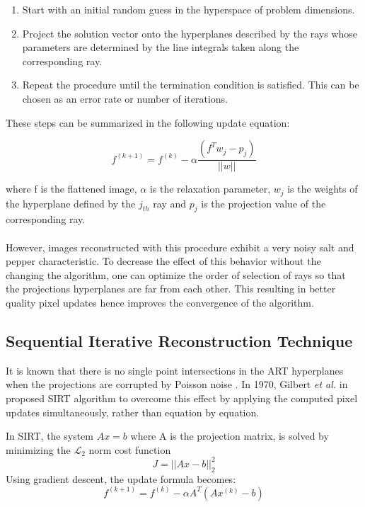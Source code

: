 \documentclass[journal]{IEEEtran}
\begin{document}
\begin{enumerate}
	\item Start with an initial random guess in the hyperspace of problem dimensions. 
	\item Project the solution vector onto the hyperplanes described by the rays whose parameters are determined by the line integrals taken along the corresponding ray. 
	\item Repeat the procedure until the termination condition is satisfied. This can be chosen as an error rate or number of iterations.  
\end{enumerate}

These steps can be summarized in the following update equation: 

\begin{equation}
	f^{(k+1)} = f^{(k)} - \alpha\frac{(f^Tw_j - p_j)}{||w||} 
\end{equation}

where f is the flattened image, $\alpha$ is the relaxation parameter, $w_j$ is the weights of the hyperplane defined by the $j_{th}$ ray and $p_j$ is the projection value of the corresponding ray. 
\\
\\
However, images reconstructed with this procedure exhibit a very noisy salt and pepper characteristic. To decrease the effect of this behavior without the changing the algorithm, one can optimize the order of selection of rays so that the projections hyperplanes are far from each other. This resulting in better quality pixel updates hence improves the convergence of the algorithm.

\subsection{Sequential Iterative Reconstruction Technique}

It is known that there is no single point intersections in the ART hyperplanes when the projections are corrupted by Poisson noise \cite*{dong2020accelerated}.  
In 1970, Gilbert \textit{et al.} in \cite*{gilbert1972iterative} proposed SIRT algorithm to overcome this effect by applying the computed pixel updates simultaneously, rather than equation by equation. 

In SIRT, the system $Ax=b$ where A is the projection matrix, is solved by minimizing the $\mathcal{L_2}$ norm cost function $$J = ||Ax-b||_2^2$$
Using gradient descent, the update formula becomes:
\begin{equation}
	f^{(k+1)} = f^{(k)} - \alpha A^T(Ax^{(k)}-b)
\end{equation}
\end{document}
